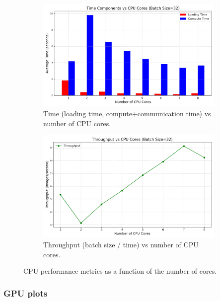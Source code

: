 \documentclass{article}
\begin{document}
\begin{figure}[h!]
    \centering
    \begin{subfigure}[b]{0.48\textwidth}
        \centering
        \includegraphics[width=\textwidth]{CPU/time_components_bar.png}
        \caption{Time (loading time, compute+communication time) vs number of CPU cores.}
        \label{fig:cpu_time}
    \end{subfigure}
    \hfill
    \begin{subfigure}[b]{0.48\textwidth}
        \centering
        \includegraphics[width=\textwidth]{CPU/throughput_line.png}
        \caption{Throughput (batch size / time) vs number of CPU cores.}
        \label{fig:cpu_throughput}
    \end{subfigure}
    \caption{CPU performance metrics as a function of the number of cores.}
    \label{fig:cpu_plots}
\end{figure}

\subsubsection{GPU plots}
\end{document}
